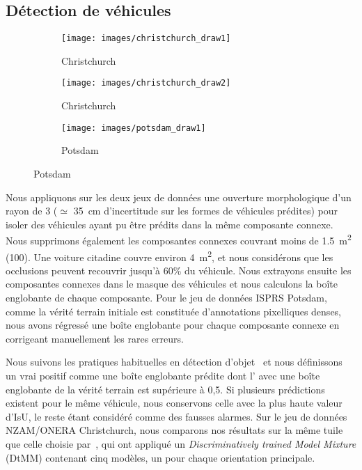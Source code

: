 \subsection{Détection de véhicules}
\begin{figure}[t]
\centering
	\begin{subfigure}{0.3\textwidth}
    	\texttt{[image: images/christchurch\_draw1]}
    	\caption*{Christchurch}
    \end{subfigure}
    \begin{subfigure}{0.3\textwidth}
    	\texttt{[image: images/christchurch\_draw2]}
    	\caption*{Christchurch}
    \end{subfigure}\begin{subfigure}{0.3\textwidth}
    	\texttt{[image: images/potsdam\_draw1]}
    	\caption*{Potsdam}
    \end{subfigure}\vspace{-12pt}
    \label{fig:detection_samples}
\end{figure}

Nous appliquons sur les deux jeux de données une ouverture morphologique d'un rayon de \SI{3}{\px} ($\simeq$ \SI{35}{\centi\meter} d'incertitude sur les formes de véhicules prédites) pour isoler des véhicules ayant pu être prédits dans la même composante connexe. Nous supprimons également les composantes connexes couvrant moins de \SI{1,5}{\meter\squared} (\SI{100}{\px}). Une voiture citadine couvre environ \SI{4}{\meter\squared}, et nous considérons que les occlusions peuvent recouvrir jusqu'à 60\% du véhicule. Nous extrayons ensuite les composantes connexes dans le masque des véhicules et nous calculons la boîte englobante de chaque composante. Pour le jeu de données \gls{ISPRS} Potsdam, comme la vérité terrain initiale est constituée d'annotations pixelliques denses, nous avons régressé une boîte englobante pour chaque composante connexe en corrigeant manuellement les rares erreurs.

Nous suivons les pratiques habituelles en détection d'objet~\cite{everingham_pascal_2014} et nous définissons un vrai positif comme une boîte englobante prédite dont l' avec une boîte englobante de la vérité terrain est supérieure à 0,5. Si plusieurs prédictions existent pour le même véhicule, nous conservons celle avec la plus haute valeur d'\gls{IsU}, le reste étant considéré comme des fausses alarmes. Sur le jeu de données NZAM/ONERA Christchurch, nous comparons nos résultats sur la même tuile que celle choisie par~\citet{randrianarivo_contextual_2016}, qui ont appliqué un \emph{Discriminatively trained Model Mixture} (DtMM) contenant cinq modèles, un pour chaque orientation principale.

